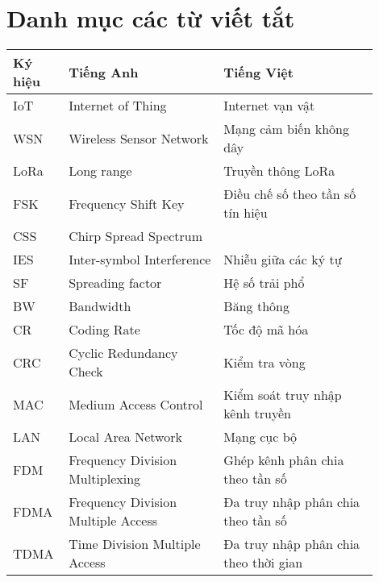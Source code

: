 \thispagestyle{plain}
\chapter*{Danh mục các từ viết tắt}
   \begin{longtable}{m{0.1\linewidth} m{0.4\linewidth} m{0.4\linewidth}}
      \hline 
       \textbf{Ký hiệu} & \textbf{Tiếng Anh} & \textbf{Tiếng Việt} \\ 
      \hline 
      IoT &	Internet of Thing & Internet vạn vật\\
      \hline
       WSN & Wireless Sensor Network & Mạng cảm biến không dây\\ 
      \hline 
       LoRa & Long range & Truyền thông LoRa\\ 
       \hline 
      FSK & Frequency Shift Key & Điều chế số theo tần số tín hiệu\\
      \hline
      CSS & Chirp Spread Spectrum & \\
      \hline
      IES & Inter-symbol Interference & Nhiễu giữa các ký tự \\
      \hline 
       SF & Spreading factor & Hệ số trải phổ\\ 
      \hline
      BW & Bandwidth & Băng thông \\ 
      \hline
      CR & Coding Rate & Tốc độ mã hóa\\
      \hline
      CRC & Cyclic Redundancy Check & Kiểm tra vòng\\
      \hline
      MAC & Medium Access Control & Kiểm soát truy nhập kênh truyền\\
      \hline
      LAN & Local Area Network & Mạng cục bộ\\
      \hline
      FDM & Frequency Division Multiplexing & Ghép kênh phân chia theo tần số\\
      \hline
      FDMA & Frequency Division Multiple Access & Đa truy nhập phân chia theo tần số\\ 
      \hline
      TDMA & Time Division Multiple Access & Đa truy nhập phân chia theo thời gian\\

\end{longtable}
